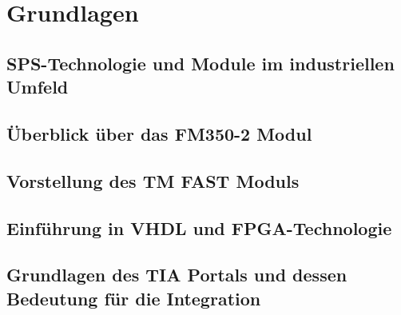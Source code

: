 \chapter{Grundlagen} 

\section{SPS-Technologie und Module im industriellen Umfeld} 
\section{Überblick über das FM350-2 Modul} 
\section{Vorstellung des TM FAST Moduls} 
\section{Einführung in VHDL und FPGA-Technologie}
\section{Grundlagen des TIA Portals und dessen Bedeutung für die Integration} 